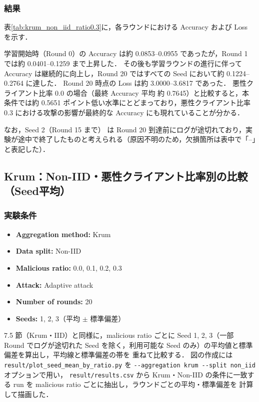 \documentclass[a4j,twocolumn,dvipdfmx]{jsarticle}
\begin{document}
\subsubsection{結果}

表\ref{tab:krum_non_iid_ratio0.3}に，各ラウンドにおける
Accuracy および Loss を示す．

学習開始時（Round 0）の Accuracy は約 0.0853--0.0955 であったが，Round 1 では約 0.0401--0.1259 まで上昇した． その後も学習ラウンドの進行に伴って Accuracy は継続的に向上し，Round 20 ではすべての Seed において約 0.1224--0.2764 に達した． Round 20 時点の Loss は約 3.0000--3.6817 であった． 悪性クライアント比率 0.0 の場合（最終 Accuracy 平均 約 0.7645）と比較すると，本条件では約 0.5651 ポイント低い水準にとどまっており，悪性クライアント比率 0.3 における攻撃の影響が最終的な Accuracy にも現れていることが分かる．

なお，Seed 2（Round 15 まで） は Round 20 到達前にログが途切れており，実験が途中で終了したものと考えられる（原因不明のため，欠損箇所は表中で「--」と表記した）．

\clearpage
\subsection{Krum：Non-IID・悪性クライアント比率別の比較（Seed平均）}

\subsubsection{実験条件}

\begin{itemize}
    \item \textbf{Aggregation method:} Krum
    \item \textbf{Data split:} Non-IID
    \item \textbf{Malicious ratio:} 0.0, 0.1, 0.2, 0.3
    \item \textbf{Attack:} Adaptive attack
    \item \textbf{Number of rounds:} 20
    \item \textbf{Seeds:} 1, 2, 3（平均 $\pm$ 標準偏差）
\end{itemize}

7.5 節（Krum・IID）と同様に，malicious ratio ごとに
Seed 1, 2, 3（一部 Round でログが途切れた Seed を除く，利用可能な
Seed のみ）の平均値と標準偏差を算出し，平均線と標準偏差の帯を
重ねて比較する．
図の作成には \verb|result/plot_seed_mean_by_ratio.py| を
\verb|--aggregation krum --split non_iid| オプションで用い，
\verb|result/results.csv| から Krum・Non-IID の条件に一致する run を
malicious ratio ごとに抽出し，ラウンドごとの平均・標準偏差を
計算して描画した．
\end{document}
